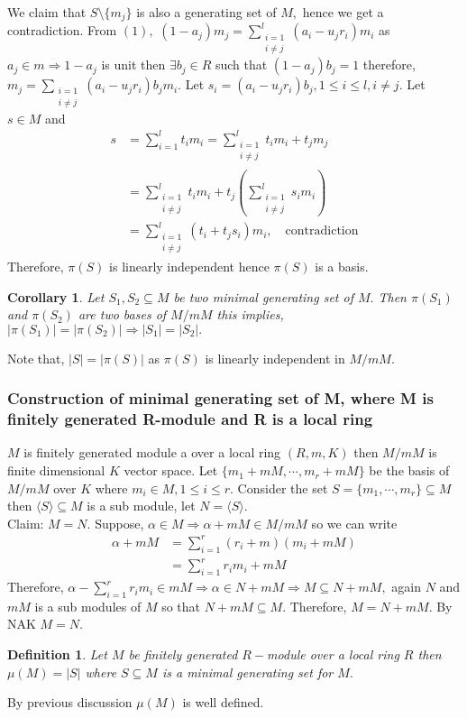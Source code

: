 \documentclass[11pt]{amsart}
\newtheorem{definition}[theorem]{Definition}%
\newtheorem{corollary}[theorem]{Corollary}%
\begin{document}
We claim that $S\setminus \{m_j\}$ is also a generating set of $M,$ hence we get a contradiction. From $(1),$ $(1-a_j)m_j=\displaystyle\sum_{\substack{i=1\\ i\neq j}}^l (a_i-u_jr_i)m_i$ as $a_j\in m \Rightarrow 1-a_j$ is unit then $\exists b_j\in R$ such that $(1-a_j)b_j=1$ therefore, $m_j=\displaystyle\sum_{\substack{i=1\\ i\neq j}} (a_i-u_jr_i)b_jm_i.$ Let $s_i=(a_i-u_jr_i)b_j,1\leq i\leq l,i\neq j.$ Let $s\in M$ and \begin{align*} 
s&=\displaystyle\sum_{i=1}^l t_im_i=\displaystyle\sum_{\substack{i=1\\ i\neq j}}^l t_im_i+t_jm_j\\
&=\displaystyle\sum_{\substack{i=1\\ i\neq j}}^l t_im_i+t_j\left(\displaystyle\sum_{\substack{i=1\\ i\neq j}}^l s_im_i\right)\\
&=\displaystyle\sum_{\substack{i=1\\ i\neq j}}^l (t_i+t_js_i)m_i, \quad \text{contradiction}
\end{align*}
Therefore, $\pi(S)$ is linearly independent hence $\pi(S)$ is a basis. 
\begin{corollary}
Let $S_1,S_2\subseteq M$ be two minimal generating set of $M.$ Then $\pi(S_1)$ and $\pi(S_2)$ are two bases of $M/mM$ this implies, $|\pi(S_1)|=|\pi(S_2)| \Rightarrow |S_1|=|S_2|.$
\end{corollary}
Note that, $|S|=|\pi(S)|$ as $\pi(S)$ is linearly independent in $M/mM.$
\subsubsection{Construction of minimal generating set of M, where M is finitely generated R-module and R is a local ring}
$M$ is finitely generated module a over a local ring $(R,m,K)$ then $M/mM$ is finite dimensional $K$ vector space. Let $\{m_1+mM,\cdots ,m_r+mM\}$ be the basis of $M/mM$ over $K$ where $m_i\in M,1\leq i\leq r.$ Consider the set $S=\{m_1,\cdots ,m_r\}\subseteq M$ then $\langle S\rangle \subseteq M$ is a sub module, let $N=\langle S\rangle.$\\
Claim: $M=N.$ Suppose, $\alpha\in M \Rightarrow \alpha+mM\in M/mM$ so we can write \begin{align*}
\alpha+mM&=\displaystyle\sum_{i=1}^r (r_i+m)(m_i+mM)\\
&=\displaystyle\sum_{i=1}^r r_im_i+mM
\end{align*}
Therefore, $\alpha-\displaystyle\sum_{i=1}^r r_im_i\in mM \Rightarrow \alpha\in N+mM \Rightarrow M\subseteq N+mM,$ again $N$ and $mM$ is a sub modules of $M$ so that $N+mM\subseteq M.$ Therefore, $M=N+mM.$ By NAK $M=N.$
\begin{definition}
Let $M$ be finitely generated $R-$module over a local ring $R$ then $\mu(M)=|S|$ where $S\subseteq M$ is a minimal generating set for $M.$
\end{definition}
By previous discussion $\mu(M)$ is well defined.
\end{document}
